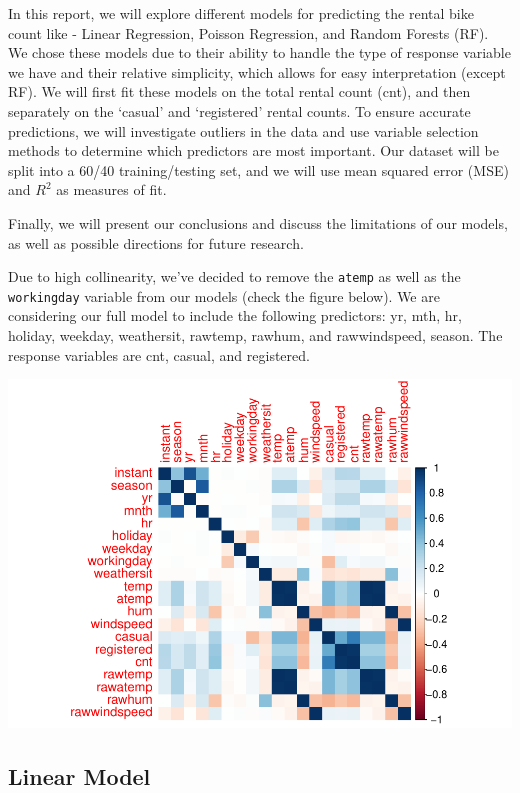 \documentclass[
]{article}
\begin{document}
In this report, we will explore different models for predicting the
rental bike count like - Linear Regression, Poisson Regression, and
Random Forests (RF). We chose these models due to their ability to
handle the type of response variable we have and their relative
simplicity, which allows for easy interpretation (except RF). We will
first fit these models on the total rental count (cnt), and then
separately on the `casual' and `registered' rental counts. To ensure
accurate predictions, we will investigate outliers in the data and use
variable selection methods to determine which predictors are most
important. Our dataset will be split into a 60/40 training/testing set,
and we will use mean squared error (MSE) and \(R^2\) as measures of fit.

Finally, we will present our conclusions and discuss the limitations of
our models, as well as possible directions for future research.

Due to high collinearity, we've decided to remove the \texttt{atemp} as
well as the \texttt{workingday} variable from our models (check the
figure below). We are considering our full model to include the
following predictors: yr, mth, hr, holiday, weekday, weathersit,
rawtemp, rawhum, and rawwindspeed, season. The response variables are
cnt, casual, and registered.

\includegraphics{draft_files/figure-latex/unnamed-chunk-2-1.pdf}

\hypertarget{linear-model}{%
\subsection{Linear Model}\label{linear-model}}
\end{document}

